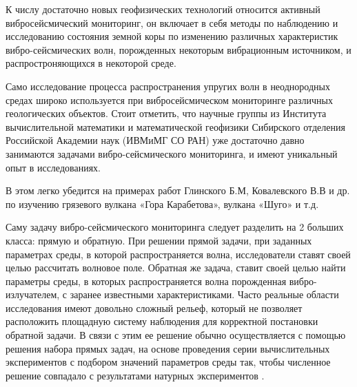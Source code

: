 
К числу достаточно новых геофизических технологий относится активный вибросейсмический мониторинг, 
он включает в себя методы по наблюдению и исследованию состояния земной коры по изменению 
различных характеристик вибро-сейсмических волн, порожденных некоторым вибрационным источником, 
и распростроняющихся в некоторой среде. 

Само исследование процесса распространения упругих волн в неоднородных средах широко
используется при вибросейсмическом мониторинге различных геологических объектов.
Стоит отметить, что научные группы из Института
вычислительной математики и математической геофизики Сибирского
отделения Российской Академии наук (ИВМиМГ СО РАН) уже достаточно давно занимаются
задачами вибро-сейсмического мониторинга, и имеют уникальный опыт в исследованиях.

В этом легко убедится на примерах работ Глинского Б.М, Ковалевского В.В и др.
по изучению грязевого вулкана «Гора Карабетова», вулкана «Шуго» и т.д.

Саму задачу вибро-сейсмического мониторинга следует разделить на 2 больших класса: прямую и обратную.
При решении прямой задачи, при заданных параметрах среды, в которой распространяется волна, 
исследователи ставят своей целью рассчитать волновое поле. Обратная же задача, ставит своей целью найти параметры среды, 
в которых распространяется волна порожденная вибро-излучателем, с заранее известными характеристиками. Часто реальные области исследования имеют довольно сложный рельеф,
который не позволяет расположить площадную систему наблюдения для корректной постановки обратной задачи. В связи с этим ее решение
обычно осуществляется с помощью решения набора прямых задач, на основе проведения серии вычислительных
экспериментов с подбором значений параметров среды так, чтобы численное решение совпадало с результатами натурных экспериментов .

